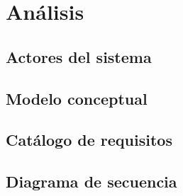 
\chapter{Análisis}\label{analisis}
\section{Actores del sistema}\label{sec:actores del sistema}

\section{Modelo conceptual}\label{sec:modelo_conceptual}

\section{Catálogo de requisitos}\label{sec:catalogo_requisitos}

\section{Diagrama de secuencia}\label{sec:diagrama_secuencia}